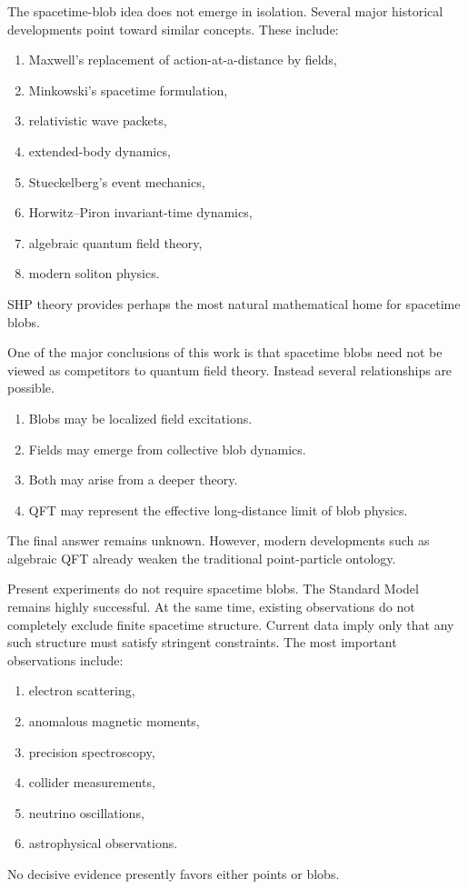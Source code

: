 The spacetime-blob idea does not emerge in isolation.
Several major historical developments point toward similar concepts.
These include:
\begin{enumerate}
\item Maxwell's replacement of action-at-a-distance by fields,
\item Minkowski's spacetime formulation,
\item relativistic wave packets,
\item extended-body dynamics,
\item Stueckelberg's event mechanics,
\item Horwitz--Piron invariant-time dynamics,
\item algebraic quantum field theory,
\item modern soliton physics.
\end{enumerate}
 SHP theory provides perhaps the most natural mathematical
home for spacetime blobs.

One of the major conclusions of this work is that spacetime blobs need
not be viewed as competitors to quantum field theory.
Instead several relationships are possible.
\begin{enumerate}
\item Blobs may be localized field excitations.
\item Fields may emerge from collective blob dynamics.
\item Both may arise from a deeper theory.
\item QFT may represent the effective long-distance limit of blob
physics.
\end{enumerate}
The final answer remains unknown.
However, modern developments such as algebraic QFT already weaken the
traditional point-particle ontology.

Present experiments do not require spacetime blobs.
The Standard Model remains highly successful.
At the same time, existing observations do not completely exclude finite
spacetime structure.
Current data imply only that any such structure must satisfy stringent
constraints.
The most important observations include:
\begin{enumerate}
\item electron scattering,
\item anomalous magnetic moments,
\item precision spectroscopy,
\item collider measurements,
\item neutrino oscillations,
\item astrophysical observations.
\end{enumerate}
No decisive evidence presently favors either points or blobs.

